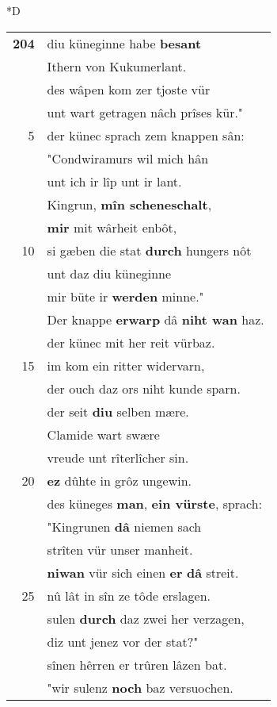 \documentclass[8pt,a4paper,notitlepage]{article}
\begin{document}
\begin{table}[ht]
\begin{minipage}[t]{0.5\linewidth}
\small
\begin{center}*D
\end{center}
\begin{tabular}{rl}
\textbf{204} & diu küneginne  habe \textbf{besant}\\ 
 & Ithern von Kukumerlant.\\ 
 & des wâpen kom zer tjoste vür\\ 
 & unt wart getragen nâch prîses kür."\\ 
5 & der künec sprach zem knappen sân:\\ 
 & "Condwiramurs wil mich hân\\ 
 & unt ich ir lîp unt ir lant.\\ 
 & Kingrun, \textbf{mîn scheneschalt},\\ 
 & \textbf{mir} mit wârheit enbôt,\\ 
10 & si gæben die stat \textbf{durch} hungers nôt\\ 
 & unt daz diu küneginne\\ 
 & mir büte ir \textbf{werden} minne."\\ 
 & Der knappe \textbf{erwarp} dâ \textbf{niht wan} haz.\\ 
 & der künec mit her reit vürbaz.\\ 
15 & im kom ein ritter widervarn,\\ 
 & der ouch daz ors niht kunde sparn.\\ 
 & der seit \textbf{diu} selben mære.\\ 
 & Clamide wart swære\\ 
 & vreude unt rîterlîcher sin.\\ 
20 & \textbf{ez} dûhte in grôz ungewin.\\ 
 & des küneges \textbf{man}, \textbf{ein vürste}, sprach:\\ 
 & "Kingrunen \textbf{dâ} niemen sach\\ 
 & strîten vür unser manheit.\\ 
 & \textbf{niwan} vür sich einen \textbf{er} \textbf{dâ} streit.\\ 
25 & nû lât in sîn ze tôde erslagen.\\ 
 & sulen \textbf{durch} daz zwei her verzagen,\\ 
 & diz unt jenez vor der stat?"\\ 
 & sînen hêrren er trûren lâzen bat.\\ 
 & "wir sulenz \textbf{noch} baz versuochen.\\ 

\end{tabular}
\end{minipage}
\end{table}
\end{document}
